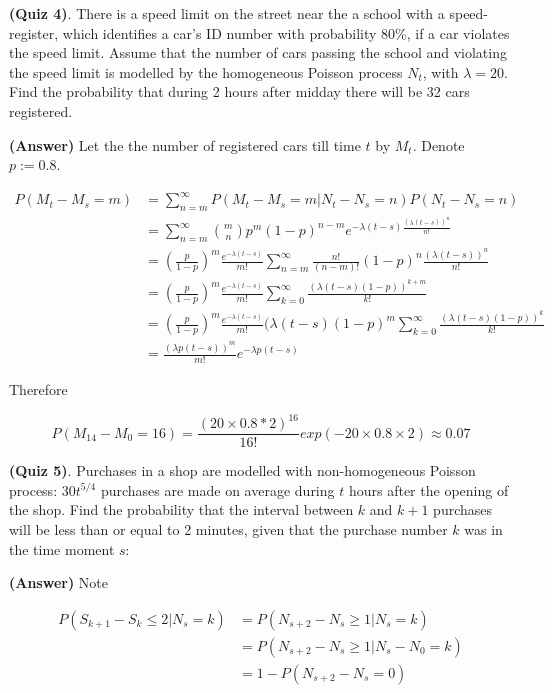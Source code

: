 \documentclass[12pt]{article}
\theoremstyle{nonumberbreak}
\begin{document}
\textbf{(Quiz 4)}. There is a speed limit on the street near the a school with a speed-register, which identifies a car's ID number with probability 80\%, if a car violates the speed limit. Assume that the number of cars passing the school and violating the speed limit is modelled by the homogeneous Poisson process $N_t$, with $\lambda=20$. Find the probability that during 2 hours after midday there will be 32 cars registered.


\textbf{(Answer)} Let the the number of registered cars till time $t$ by $M_t$. Denote $p := 0.8$. 

$$
\begin{aligned}
P(M_t - M_s = m) &= \sum_{n=m}^\infty P(M_t - M_s = m | N_t - N_s = n ) P (N_t - N_s = n)\\[8pt]
&= \sum_{n=m}^\infty \binom{m}{n} p^m (1-p)^{n-m} e^{-\lambda(t-s) \frac{(\lambda(t-s))^n}{n!}} \\[8pt]
&= (\frac{p}{1-p})^m \frac{e^{-\lambda (t-s)}}{m!}\sum_{n=m}^\infty \frac{n!}{(n-m)!} (1-p)^n \frac{(\lambda(t-s))^n}{n!} \\[8pt]
&= (\frac{p}{1-p})^m \frac{e^{-\lambda (t-s)}}{m!} \sum_{k=0}^\infty \frac{(\lambda (t-s) (1-p) )^{k+m}}{k!} \\[8pt]
&= (\frac{p}{1-p})^m \frac{e^{-\lambda (t-s)}}{m!} (\lambda (t-s) (1-p)^m \sum_{k=0}^\infty \frac{(\lambda (t-s) (1-p) )^k}{k!} \\[8pt]
&= \frac{(\lambda p (t-s))^m}{m!} e^{-\lambda p (t-s)}
\end{aligned}
$$

Therefore

$$
P (M_{14} - M_0 = 16) = \frac{(20\times 0.8 * 2)^{16}}{16!} exp(-20\times0.8\times2) \approx 0.07
$$



\textbf{(Quiz 5)}. Purchases in a shop are modelled with non-homogeneous Poisson process: $30t^{5/4}$ purchases are made on average during $t$ hours after the opening of the shop. Find the probability that the interval between $k$ and $k+1$ purchases will be less than or equal to 2 minutes, given that the purchase number $k$ was in the time moment $s$:

\textbf{(Answer)} Note


$$
\begin{aligned}
P(S_{k+1} - S_k \le 2 | N_s = k) &= P(N_{s+2} - N_s \ge 1| N_s = k) \\[8pt]
&= P(N_{s+2} - N_s \ge 1 | N_s - N_0 = k) \\[8pt]
&= 1 - P(N_{s+2} - N_s = 0)
\end{aligned}
$$
\end{document}

